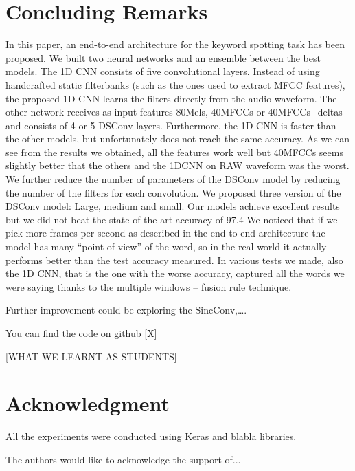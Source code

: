 \documentclass[conference]{IEEEtran}
\begin{document}
\section{Concluding Remarks}
In this paper, an end-to-end architecture for the keyword spotting task has been proposed. We built two neural networks and an ensemble between the best models.
The 1D CNN consists of five convolutional layers. Instead of using handcrafted static filterbanks (such as the ones used to extract MFCC features), the proposed 1D CNN learns the filters directly from the audio waveform. The other network receives as input features 80Mels, 40MFCCs or 40MFCCs+deltas and consists of 4 or 5 DSConv layers.
Furthermore, the 1D CNN is faster than the other models, but unfortunately does not reach the same accuracy.
As we can see from the results we obtained, all the features work well but 40MFCCs seems slightly better that the others and the 1DCNN on RAW waveform was the worst.
We further reduce the number of parameters of the DSConv model by reducing the number of the filters for each convolution. We proposed three version of the DSConv model: Large, medium and small.
Our models achieve excellent results but we did not beat the state of the art accuracy of 97.4%
We noticed that if we pick more frames per second as described in the end-to-end architecture the model has many “point of view” of the word, so in the real world it actually performs better than the test accuracy measured. In various tests we made, also the 1D CNN, that is the one with the worse accuracy, captured all the words we were saying thanks to the multiple windows – fusion rule technique.

Further improvement could be exploring the SincConv,….

You can find the code on github [X]

[WHAT WE LEARNT AS STUDENTS]


\section*{Acknowledgment}
All the experiments were conducted using Keras and blabla libraries.

The authors would like to acknowledge the support of...
\end{document}
